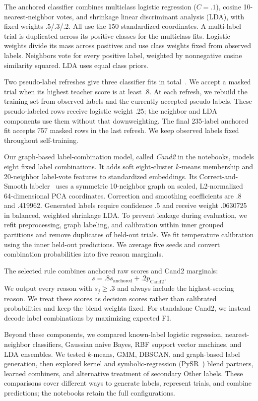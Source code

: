 \documentclass[10pt,twocolumn,letterpaper]{article}
\begin{document}
The anchored classifier combines multiclass logistic regression ($C=.1$),
cosine 10-nearest-neighbor votes, and shrinkage linear discriminant analysis
(LDA), with fixed weights .5/.3/.2. All use the 150 standardized coordinates.
A multi-label trial is duplicated across its positive classes for the
multiclass fits. Logistic weights divide its mass across positives and use
class weights fixed from observed labels. Neighbors vote for every positive label,
weighted by nonnegative cosine similarity squared. LDA uses equal class priors.

Two pseudo-label refreshes give three classifier fits in total~\cite{yarowsky1995unsupervised,triguero2015selflabeled}.
We accept a masked trial when its highest teacher score is at least .8. At each
refresh, we rebuild the training set from observed labels and the currently
accepted pseudo-labels. These pseudo-labeled rows receive logistic weight .25;
the neighbor and LDA components use them without
that downweighting. The final 235-label anchored fit accepts 757 masked rows in
the last refresh. We keep observed labels fixed throughout self-training.

Our graph-based label-combination model, called \emph{Cand2} in the notebooks,
models eight fixed label combinations. It adds soft eight-cluster $k$-means
membership and 20-neighbor label-vote features
to standardized embeddings. Its Correct-and-Smooth
labeler~\cite{huang2020correctsmooth} uses a symmetric 10-neighbor graph on
scaled, L2-normalized 64-dimensional PCA coordinates. Correction and smoothing
coefficients are .8 and .419962. Generated labels require confidence .5 and
receive weight .0630725 in balanced, weighted shrinkage LDA. To prevent leakage
during evaluation, we refit preprocessing, graph labeling, and calibration within inner grouped
partitions and remove duplicates of held-out trials. We fit temperature
calibration using the inner held-out predictions. We average five seeds and
convert combination probabilities into five reason marginals.

The selected rule combines anchored raw scores and Cand2 marginals:
\[
s = .8s_{\mathrm{anchored}} + .2p_{\mathrm{Cand2}}.
\]
We output every reason with $s_j\geq .3$ and always include the highest-scoring
reason. We treat these scores as decision scores rather than calibrated
probabilities and keep the blend weights fixed. For standalone
Cand2, we instead decode label combinations by maximizing expected F1.

Beyond these components, we compared known-label logistic regression,
nearest-neighbor classifiers, Gaussian naive Bayes, RBF support vector
machines, and LDA ensembles. We tested $k$-means, GMM, DBSCAN, and graph-based
label generation, then explored kernel and symbolic-regression
(PySR~\cite{cranmer2023pysr}) blend partners,
learned combiners, and alternative treatment of secondary Other labels. These
comparisons cover different ways to generate labels, represent trials, and
combine predictions; the notebooks retain the full configurations.
\end{document}
